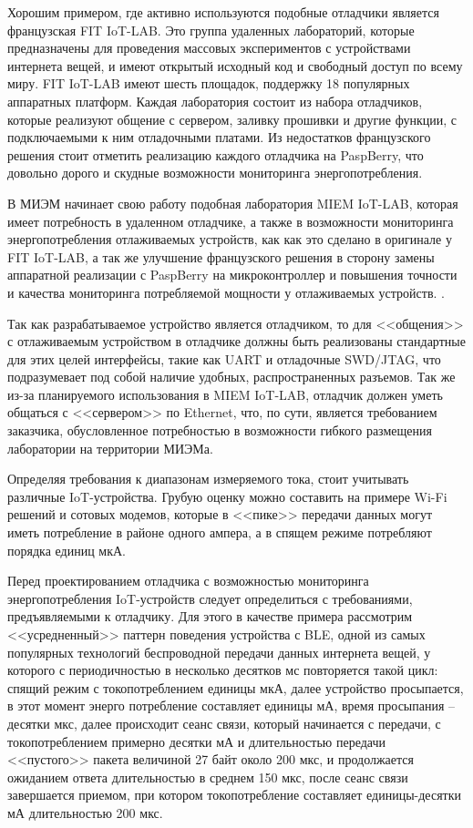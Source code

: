 Хорошим примером, где активно используются подобные отладчики является французская FIT IoT-LAB. 
Это группа удаленных лабораторий, которые предназначены для проведения массовых экспериментов 
с устройствами интернета вещей, и имеют открытый исходный код и свободный доступ по всему миру.
FIT IoT-LAB имеют шесть площадок, поддержку 18 популярных аппаратных платформ. 
Каждая лаборатория состоит из набора отладчиков, которые реализуют общение с сервером, заливку прошивки
и другие функции, с подключаемыми к ним отладочными платами. Из недостатков французского решения стоит 
отметить реализацию каждого отладчика на PaspBerry, что довольно дорого и скудные возможности мониторинга 
энергопотребления.

В МИЭМ начинает свою работу подобная лаборатория MIEM IoT-LAB, которая имеет потребность в удаленном
отладчике, а также в возможности мониторинга энергопотребления отлаживаемых устройств, 
как как это сделано в оригинале у FIT IoT-LAB, а так же улучшение французского решения в сторону 
замены аппаратной реализации с PaspBerry на микроконтроллер и повышения 
точности и качества мониторинга потребляемой мощности у отлаживаемых устройств. \cite{FITIoT}.

Так как разрабатываемое устройство является отладчиком, то для <<общения>> с отлаживаемым устройством 
в отладчике должны быть реализованы стандартные для этих целей интерфейсы, такие как UART и отладочные 
SWD/JTAG, что подразумевает под собой наличие удобных, распространенных разъемов. Так же из-за планируемого 
использования в MIEM IoT-LAB, отладчик должен уметь общаться с <<сервером>> по Ethernet, что, по сути,
является требованием заказчика, обусловленное потребностью в возможности гибкого размещения лаборатории на 
территории МИЭМа.

Определяя требования к диапазонам измеряемого тока, стоит учитывать различные IoT-устройства. Грубую оценку
можно составить на примере Wi-Fi решений и сотовых модемов, которые в <<пике>> передачи данных могут 
иметь потребление в районе одного ампера, а в спящем режиме потребляют порядка единиц мкА.


Перед проектированием отладчика с возможностью мониторинга энергопотребления IoT-устройств
следует определиться с требованиями, предъявляемыми к отладчику. 
Для этого в качестве примера рассмотрим <<усредненный>> паттерн поведения устройства с BLE, одной
из самых популярных технологий беспроводной передачи данных интернета вещей, 
у которого с периодичностью в несколько десятков мс повторяется такой цикл: спящий режим 
с токопотреблением единицы мкА, далее устройство просыпается, в этот момент
энерго потребление составляет единицы мА, время просыпания -- десятки мкс, далее происходит
сеанс связи, который начинается с передачи, с токопотреблением примерно десятки мА 
и длительностью передачи <<пустого>> пакета величиной 27 байт около 200 мкс, и продолжается 
ожиданием ответа длительностью в среднем 150 мкс, после сеанс связи завершается приемом,
при котором токопотребление составляет единицы-десятки мА длительностью 200 мкс.

